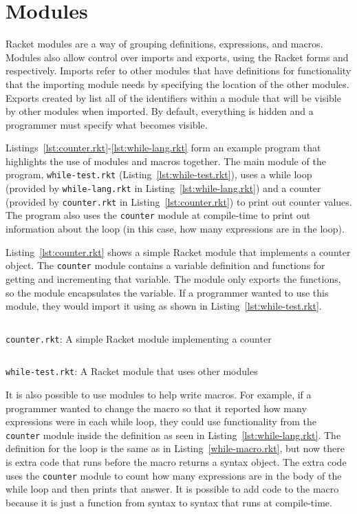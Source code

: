 \section{Modules}
Racket modules are a way of grouping definitions, expressions, and macros. 
Modules also allow control over imports and exports, using the Racket forms  and  respectively.
Imports refer to other modules that have definitions for functionality that the importing module needs by specifying the location of the other modules.
Exports created by  list all of the identifiers within a module that will be visible by other modules when imported. 
By default, everything is hidden and a programmer must specify what becomes visible.

Listings~\ref{lst:counter.rkt}-\ref{lst:while-lang.rkt} form an example program that highlights the use of modules and macros together.
The main module of the program, \texttt{while-test.rkt} (Listing~\ref{lst:while-test.rkt}), uses a while loop (provided by \texttt{while-lang.rkt} in Listing~\ref{lst:while-lang.rkt}) and a counter (provided by \texttt{counter.rkt} in Listing~\ref{lst:counter.rkt}) to print out counter values.
The program also uses the \texttt{counter} module at compile-time to print out information about the  loop (in this case, how many expressions are in the  loop).

Listing~\ref{lst:counter.rkt} shows a simple Racket module that implements a counter object.
The \texttt{counter} module contains a variable definition and functions for getting and incrementing that variable.
The module only exports the functions, so the module encapsulates the variable.
If a programmer wanted to use this module, they would import it using  as shown in Listing~\ref{lst:while-test.rkt}. 
\begin{listing}[tb]
  \inputminted{racket}{listings/counter.rkt}
  \caption{\texttt{counter.rkt}: A simple Racket module implementing a counter}
  \label{lst:counter.rkt}
\end{listing}

\begin{listing}[tb]
  \inputminted{racket}{listings/while-test.rkt}
  \caption{\texttt{while-test.rkt}: A Racket module that uses other modules}
  \label{lst:while-test.rkt}
\end{listing}

It is also possible to use modules to help write macros.
For example, if a programmer wanted to change the  macro so that it reported how many expressions were in each while loop, they could use functionality from the \texttt{counter} module inside the  definition as seen in Listing~\ref{lst:while-lang.rkt}.
The definition for the  loop is the same as in Listing~\ref{while-macro.rkt}, but now there is extra code that runs before the macro returns a syntax object.
The extra code uses the \texttt{counter} module to count how many expressions are in the body of the while loop and then prints that answer.
It is possible to add code to the  macro because it is just a function from syntax to syntax that runs at compile-time. 

